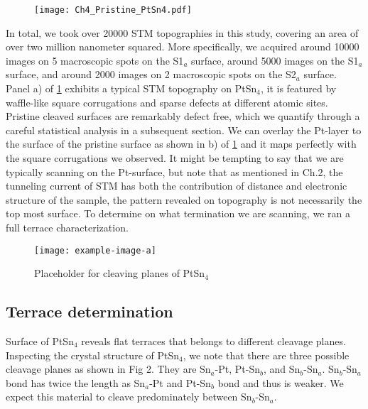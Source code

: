 \begin{figure}
	\centering
	\texttt{[image: Ch4\_Pristine\_PtSn4.pdf]}
	\caption{ }
	\label{fig:ch4_pristinetopo}
\end{figure}

\par In total, we took over 20000 STM topographies in this study, covering an area of over two million nanometer squared. More specifically, we acquired around 10000 images on 5 macroscopic spots on the S1$_a$ surface, around 5000 images on the S1$_a$ surface, and around 2000 images on 2 macroscopic spots on the S2$_a$ surface. 
Panel a) of \ref{fig:ch4_pristinetopo} exhibits a typical STM topography on PtSn$_4$, it is featured by waffle-like square corrugations and sparse defects at different atomic sites. Pristine cleaved surfaces are remarkably defect free, which we quantify through a careful statistical analysis in a subsequent section. We can overlay the Pt-layer to the surface of the pristine surface as shown in b) of \ref{fig:ch4_pristinetopo} and it maps perfectly with the square corrugations we observed. It might be tempting to say that we are typically scanning on the Pt-surface, but note that as mentioned in Ch.2, the tunneling current of STM has both the contribution of distance and electronic structure of the sample, the pattern revealed on topography is not necessarily the top most surface. To determine on what termination we are scanning, we ran a full terrace characterization.

\begin{figure}
	\centering
	\texttt{[image: example-image-a]} %
	\caption{Placeholder for cleaving planes of PtSn$_4$}
	\label{fig:ch4_cleavingplane}
\end{figure}


\subsection{Terrace determination}
\par Surface of PtSn$_4$ reveals flat terraces that belongs to different cleavage planes. Inspecting the crystal structure of PtSn$_4$, we note that there are three possible cleavage planes as shown in Fig 2. They are Sn$_a$-Pt, Pt-Sn$_b$, and Sn$_b$-Sn$_a$. Sn$_b$-Sn$_a$ bond has twice the length as Sn$_a$-Pt and Pt-Sn$_b$ bond and thus is weaker. We expect this material to cleave predominately between Sn$_b$-Sn$_a$. 

